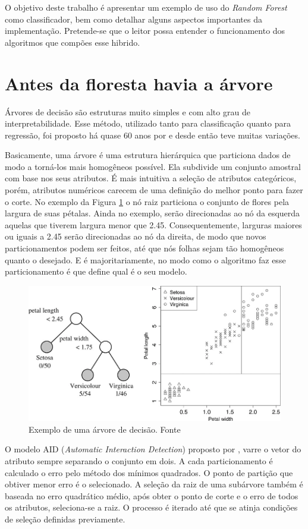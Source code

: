 \documentclass[12pt]{article}
\begin{document}
O objetivo deste trabalho é apresentar um exemplo de uso do \textit{Random Forest} como classificador, bem como detalhar alguns aspectos importantes da implementação. Pretende-se que o leitor possa entender o funcionamento dos algoritmos que compões esse hibrido.

\section{Antes da floresta havia a árvore} \label{sec:firstpage}

Árvores de decisão são estruturas muito simples e com alto grau de interpretabilidade. Esse método, utilizado tanto para classificação quanto para regressão, foi proposto há quase 60 anos por \cite{Morgan_1963} e desde então teve muitas variações.

Basicamente, uma árvore é uma estrutura hierárquica que particiona dados de modo a torná-los mais homogêneos possível. Ela subdivide um conjunto amostral com base nos seus atributos. É mais intuitiva a seleção de atributos categóricos, porém, atributos numéricos carecem de uma definição do melhor ponto para fazer o corte. No exemplo da Figura \ref{Fig1} o nó raiz particiona o conjunto de flores pela largura de suas pétalas. Ainda no exemplo, serão direcionadas ao nó da esquerda aquelas que tiverem largura menor que 2.45. Consequentemente, larguras maiores ou iguais a 2.45 serão direcionadas ao nó da direita, de modo que novos particionamentos podem ser feitos, até que nós folhas sejam tão homogêneos quanto o desejado. E é majoritariamente, no modo como o algoritmo faz esse particionamento é que define qual é o seu modelo.

\begin{figure}[ht]
\centering
\includegraphics[width=.5\textwidth]{fig1.png}
\caption{Exemplo de uma árvore de decisão. Fonte \cite{Loh_2014}}
\label{Fig1}
\end{figure}

O modelo AID (\emph{Automatic Interaction Detection}) proposto por \cite{Morgan_1963}, varre o vetor do atributo sempre separando o conjunto em dois. A cada particionamento é calculado o erro pelo método dos mínimos quadrados. O ponto de partição que obtiver menor erro é o selecionado. A seleção da raiz de uma subárvore também é baseada no erro quadrático médio, após obter o ponto de corte e o erro de todos os atributos, seleciona-se a raiz. O processo é iterado até que se atinja condições de seleção definidas previamente.
\end{document}
